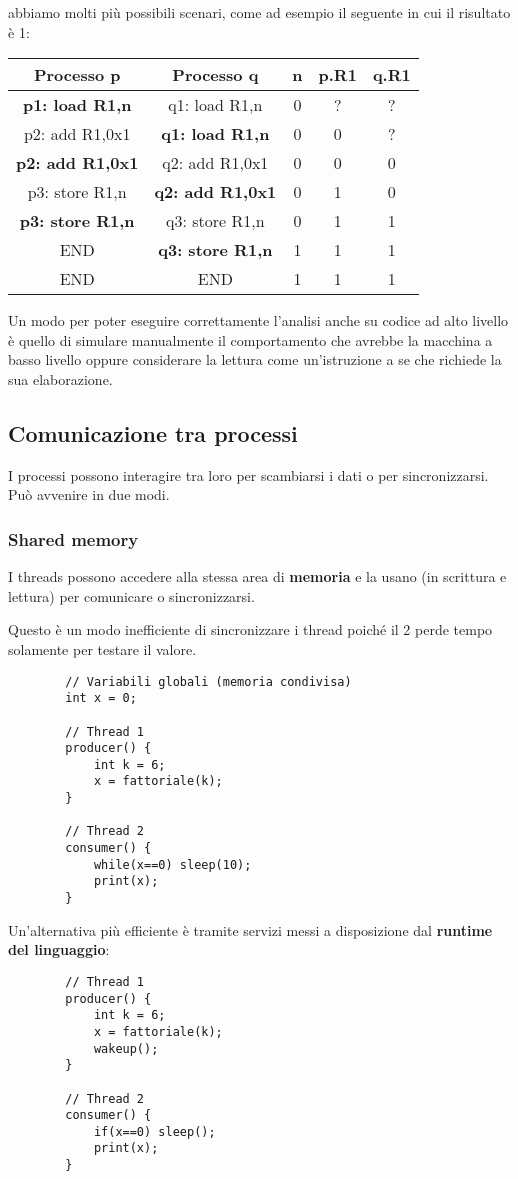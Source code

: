 \begin{example}
	abbiamo molti più possibili scenari, come ad esempio il seguente in cui il risultato è 1:
	\begin{center}
		\begin{tabular}{|c|c|c|c|c|}
			\hline
			\textbf{Processo p} & \textbf{Processo q} & \textbf{n} & \textbf{p.R1} & \textbf{q.R1} \\
			\hline
			\textbf{p1: load R1,n} & q1: load R1,n & 0 & ? & ? \\
			\hline
			p2: add R1,0x1 & \textbf{q1: load R1,n} & 0 & 0 & ? \\
			\hline
			\textbf{p2: add R1,0x1} & q2: add R1,0x1 & 0 & 0 & 0 \\
			\hline
			p3: store R1,n & \textbf{q2: add R1,0x1} & 0 & 1 & 0 \\
			\hline
			\textbf{p3: store R1,n} & q3: store R1,n & 0 & 1 & 1 \\
			\hline
			END & \textbf{q3: store R1,n} & 1 & 1 & 1 \\
			\hline
			END & END & 1 & 1 & 1 \\
			\hline
		\end{tabular}
	\end{center}
	Un modo per poter eseguire correttamente l'analisi anche su codice ad alto livello è quello di simulare manualmente il comportamento che avrebbe la macchina a basso livello oppure considerare la lettura come un'istruzione a se che richiede la sua elaborazione.
\end{example}
\subsection{Comunicazione tra processi}
I processi possono interagire tra loro per scambiarsi i dati o per sincronizzarsi. Può avvenire in due modi.
\subsubsection{Shared memory}
I threads possono accedere alla stessa area di \textbf{memoria} e la usano (in scrittura e lettura) per comunicare o sincronizzarsi.
\begin{example}
	Questo è un modo inefficiente di sincronizzare i thread poiché il 2 perde tempo solamente per testare il valore.
	\begin{lstlisting}
		// Variabili globali (memoria condivisa)
		int x = 0;
		
		// Thread 1
		producer() {
			int k = 6;
			x = fattoriale(k);
		}
		
		// Thread 2
		consumer() {
			while(x==0) sleep(10);
			print(x);
		}
	\end{lstlisting}
	Un'alternativa più efficiente è tramite servizi messi a disposizione dal \textbf{runtime del linguaggio}:
	\begin{lstlisting}
		// Thread 1
		producer() {
			int k = 6;
			x = fattoriale(k);
			wakeup();
		}
		
		// Thread 2
		consumer() {
			if(x==0) sleep();
			print(x);
		}
	\end{lstlisting}
\end{example}

